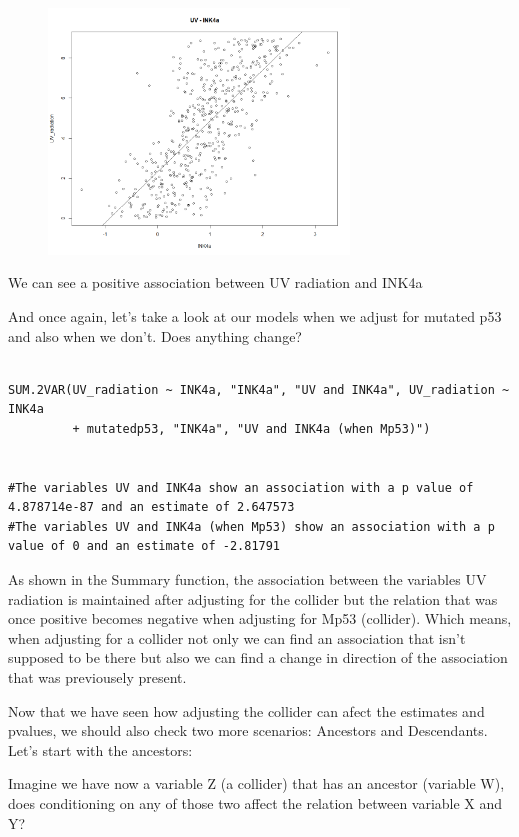 \documentclass{article}
\begin{document}
\begin{figure}[h]
\includegraphics[width=8cm]{PLOT_UV_INK4A.png}
\centering
\end{figure}


We can see a positive association between UV radiation and INK4a

And once again, let's take a look at our models when we adjust for mutated p53 and also when we don't. Does anything change?

\begin{lstlisting}

SUM.2VAR(UV_radiation ~ INK4a, "INK4a", "UV and INK4a", UV_radiation ~ INK4a
         + mutatedp53, "INK4a", "UV and INK4a (when Mp53)")


#The variables UV and INK4a show an association with a p value of 4.878714e-87 and an estimate of 2.647573 
#The variables UV and INK4a (when Mp53) show an association with a p value of 0 and an estimate of -2.81791 

\end{lstlisting}


As shown in the Summary function, the association between the variables UV  radiation is maintained after adjusting for the collider but the relation that was once positive becomes negative when adjusting for Mp53 (collider). Which means, when adjusting for a collider not only we can find an association that isn't supposed to be there but also we can find a change in direction of the association that was previousely present.


Now that we have seen how adjusting the collider can afect the estimates and pvalues, we should also check two more scenarios: Ancestors and Descendants. Let's start with the ancestors:


Imagine we have now a variable Z (a collider) that has an ancestor (variable W), does conditioning on any of those two affect the relation between variable X and Y?
\end{document}
